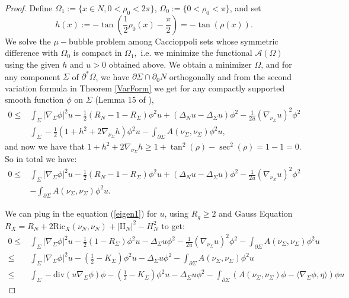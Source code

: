\documentclass[12pt]{amsart}
\newcommand{\sff}{\mathrm{I\!I}}
\newcommand{\Ric}{\text{Ric}}
\newcommand{\dive}{\text{div}}
\numberwithin{equation}{section}
\begin{document}
\begin{proof}
		Define $\Omega_1:=\{x\in N,0  <\rho_0<2\pi\}$, $\Omega_0:=\{0  <\rho_0<\pi\}$, and set $$h(x):=-\tan(\frac{1}{2}\rho_0(x)-\frac{\pi}{2})=-\tan(\rho(x)).$$ We solve the $\mu-$bubble problem among Caccioppoli sets whose symmetric difference with $\Omega_0$ is compact in $\Omega_1,$ i.e. we minimize the functional $\mathcal{A}(\Omega)$ using the given $h$ and $u>0$ obtained above.  We obtain a minimizer $\Omega$,  and for any component $\Sigma$ of $\partial^{*} \Omega$, we have $\partial \Sigma \cap \partial_0 N$ orthogonally and from the second variation formula in Theorem \ref{VarForm} we get for any compactly supported smooth function $\phi$ on $\Sigma$ (Lemma 15 of \cite{ChodoLi2020-GeneralizedSoapBubbles}),
		\begin{align*}
			0 \leq &\int_{\Sigma} |\nabla_{\Sigma} \phi|^2u - \frac{1}{2}(R_N-1-R_{\Sigma})\phi^2 u +(\Delta_N u-\Delta_{\Sigma}u) \phi^2 -\frac{1}{2u} (\nabla_{\nu_{\Sigma}}u)^2 \phi^2 \\
			&\int_{\Sigma} -\frac{1}{2}(1+h^2+2\nabla_{\nu_{\Sigma}}h)\phi^2 u-\int_{\partial \Sigma} A (\nu_{\Sigma},\nu_{\Sigma}) \phi^2 u,
		\end{align*}
		and now we have that $1+h^2+2\nabla_{\nu_{\Sigma}}h \geq 1+\tan^2(\rho)-\sec^2(\rho) =1-1=0.$ So in total we have:
		\begin{align*}
			0 \leq &\int_{\Sigma} |\nabla_{\Sigma} \phi|^2u - \frac{1}{2}(R_N-1-R_{\Sigma})\phi^2 u +(\Delta_N u-\Delta_{\Sigma}u) \phi^2 -\frac{1}{2u} (\nabla_{\nu_{\Sigma}}u)^2 \phi^2 \\
			&-\int_{\partial \Sigma} A(\nu_{\Sigma},\nu_{\Sigma}) \phi^2 u.
		\end{align*}

		We can plug in the equation (\ref{eigen1}) for $u$, using $R_g \geq 2$ and Gauss Equation $R_X=R_N +2\Ric_X(\nu_N,\nu_N)+|\sff_N|^2-H^2_N$ to get:
		\begin{align*}
			0 \leq &\int_\Sigma |\nabla_\Sigma \phi|^2 u -\frac{1}{2}(1-R_{\Sigma})\phi^2u-\Delta_{\Sigma}u \phi^2 -\frac{1}{2u} (\nabla_{\nu_{\Sigma}}u)^2 \phi^2 -\int_{\partial \Sigma} A (\nu_{\Sigma},\nu_{\Sigma}) \phi^2 u \\
			\leq & \int_{\Sigma} |\nabla_{\Sigma} \phi|^2 u -(\frac{1}{2}-K_{\Sigma}) \phi^2 u -\Delta_{\Sigma} u \phi^2 -\int_{\partial \Sigma} A (\nu_{\Sigma},\nu_{\Sigma}) \phi^2 u\\
			\leq & \int_{\Sigma} -\dive(u\nabla_{\Sigma} \phi) \phi -(\frac{1}{2}-K_{\Sigma})  \phi^2 u  -\Delta_{\Sigma} u \phi^2 - \int_{\partial \Sigma} (A (\nu_{\Sigma},\nu_{\Sigma}) \phi-\langle \nabla_{\Sigma}\phi, \eta\rangle) \phi u
		\end{align*}


\end{proof}
\end{document}
